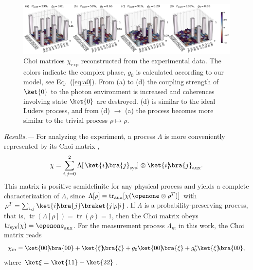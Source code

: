 \documentclass[
aps,prl,
reprint,
a4paper,
superscriptaddress,
floatfix,
]{revtex4-1}
\DeclareMathOperator{\tr}{tr}
\newcommand{\ketbra}[2]{{\ket{#1}\!\!\bra{#2}}}
\newcommand{\proj}[1]{{\ketbra{#1}{#1}}}
\begin{document}
\begin{figure}[htp]
\includegraphics[width=\linewidth]{chi_phase_total.pdf}
\caption{\label{fig:chi}%
Choi matrices $\chi_\mathrm{exp}$ reconstructed from the experimental data. The colors indicate the complex phase,
$g_0$ is calculated according to our model, see Eq.~(\ref{eq:a0}).
From (a) to (d) the coupling strength of $\ket{0}$ to the photon environment is increased and coherences involving state $\ket{0}$ are destroyed.
(d) is similar to the ideal Lüders process, and from (d) $\rightarrow$ (a) the process becomes more similar to the trivial process $\rho \mapsto \rho$.}
\end{figure}

{\em Results.---}%
For analyzing the experiment, a process $\Lambda$ is more conveniently 
 represented by its Choi matrix \cite{Heinosaari12},
%
\begin{equation}
 \chi= \sum_{i,j=0}^2 
\Lambda[\,\ketbra{i}j_\mathrm{sys}]\otimes\ketbra{i}j_\mathrm{aux}.
\end{equation}
%
This matrix is positive semidefinite for any physical process and yields a 
 complete characterization of $\Lambda$, since
 $\Lambda[\rho]= \tr_\mathrm{aux}[\chi(\openone\otimes\rho^T)]$ with
 $\rho^T= \sum_{i,j}\ketbra{i}j\braket{j|\rho|i}$.
If $\Lambda$ is a probability-preserving process, that is, $\tr(\Lambda[\rho])= 
 \tr(\rho)= 1$, then the Choi matrix obeys $\tr_\mathrm{sys}(\chi)= 
 \openone_\mathrm{aux}$.
For the measurement process $\Lambda_m$ in this work, the Choi matrix reads
%
\begin{equation}\label{eq:choimodel}
 \chi_m= \proj{00}+\proj{\xi}+
 g_0\ketbra{00}{\xi}+g_0^*\ketbra{\xi}{00},
\end{equation}
%
 where $\ket\xi= \ket{11}+\ket{22}$.
\end{document}
